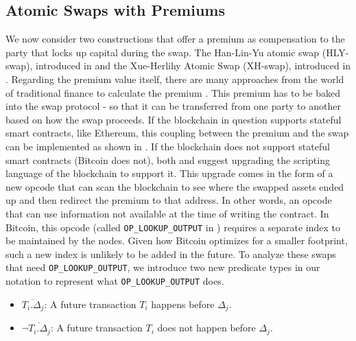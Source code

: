 \subsection{Atomic Swaps with Premiums}
We now consider two constructions that offer a premium as compensation to the party that locks up capital during the swap. The Han-Lin-Yu atomic swap (HLY-swap), introduced in \cite{atomic_swaps_american_call_options} and the Xue-Herlihy Atomic Swap (XH-swap), introduced in \cite{xue_herlihy_swap}. Regarding the premium value itself, there are many approaches from the world of traditional finance to calculate the premium \cite{atomic_swaps_american_call_options}. This premium has to be baked into the swap protocol - so that it can be transferred from one party to another based on how the swap proceeds. If the blockchain in question supports stateful smart contracts, like Ethereum, this coupling between the premium and the swap can be implemented as shown in \cite{atomic_swaps_american_call_options}. If the blockchain does not support stateful smart contracts (Bitcoin does not), both \cite{atomic_swaps_american_call_options} and \cite{xue_herlihy_swap} suggest upgrading the scripting language of the blockchain to support it. This upgrade comes in the form of a new opcode that can scan the blockchain to see where the swapped assets ended up and then redirect the premium to that address. In other words, an opcode that can use information not available at the time of writing the contract. In Bitcoin, this opcode (called \texttt{OP\_LOOKUP\_OUTPUT} in \cite{atomic_swaps_american_call_options}) requires a separate index to be maintained by the nodes. Given how Bitcoin optimizes for a smaller footprint, such a new index is unlikely to be added in the future. To analyze these swaps that need \texttt{OP\_LOOKUP\_OUTPUT}, we introduce two new predicate types in our notation to represent what \texttt{OP\_LOOKUP\_OUTPUT} does.
\begin{itemize}
    \item $\overline{T_i.\Delta_j}$: A future transaction $T_i$ happens before $\Delta_j$.
    \item $\neg{\overline{T_i.\Delta_j}}$: A future transaction $T_i$ does not happen before $\Delta_j$.
\end{itemize}

